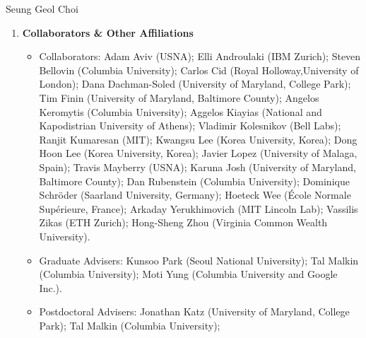 \documentclass[11pt]{article}
\def\BI{\begin{itemize}}
\def\EI{\end{itemize}}
\begin{document}
\begin{center}
{\LARGE Seung Geol Choi}
\end{center}

\begin{enumerate}[label=\textbf{(\alph*)}]

\item {\bf Collaborators \& Other Affiliations}
\BI

\item Collaborators:
	  Adam Aviv (USNA);
    Elli Androulaki (IBM Zurich);
    Steven Bellovin (Columbia University); 
    Carlos Cid (Royal Holloway,University of London);
    Dana Dachman-Soled (University of Maryland, College Park);
    Tim Finin (University of Maryland, Baltimore County); 
    Angelos Keromytis (Columbia University);
    Aggelos Kiayias (National and Kapodistrian University of Athens);
    Vladimir Kolesnikov (Bell Labs);
    Ranjit Kumaresan (MIT);
    Kwangsu Lee (Korea University, Korea);
    Dong Hoon Lee (Korea University, Korea);
    Javier Lopez (University of Malaga, Spain);
	  Travis Mayberry (USNA);
    Karuna Josh (University of Maryland, Baltimore County);
    Dan Rubenstein (Columbia University);
    Dominique Schr{\"o}der (Saarland University, Germany);
    Hoeteck Wee (\'Ecole Normale Sup\'erieure, France);
    Arkaday Yerukhimovich (MIT Lincoln Lab);
    Vassilis Zikas (ETH Zurich); 
    Hong-Sheng Zhou (Virginia Common Wealth University). 

\item Graduate Advisers: Kunsoo Park (Seoul National
    University); Tal Malkin (Columbia University); Moti
    Yung (Columbia University and Google Inc.).
\item Postdoctoral Advisers:  Jonathan Katz (University of
    Maryland, College Park); Tal Malkin (Columbia University);
\EI
\end{enumerate}
\end{document}
